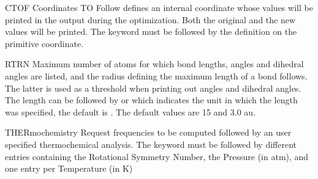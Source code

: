 \begin{keywordlist}
\item[CTOF]
Coordinates TO Follow defines an internal coordinate whose values
will be printed in the output during the optimization. Both
the original and the new values will be printed.
The keyword must be followed by the definition on the primitive
coordinate.
\item[RTRN]
Maximum number of atoms for which bond lengths, angles and dihedral
angles are listed, and
the radius defining the maximum length of a bond follows.
The latter is used as a threshold when printing out
angles and dihedral angles. The length can be followed by
 or
 which indicates the unit in which the length
was specified, the default is
.
The default values are 15 and 3.0 au.
\item[THERmochemistry]
Request frequencies to be computed followed by an user specified thermochemical analysis.
The keyword must be followed by different entries containing the Rotational Symmetry Number,
the Pressure (in atm), and one entry per Temperature (in K)

\end{keywordlist}
